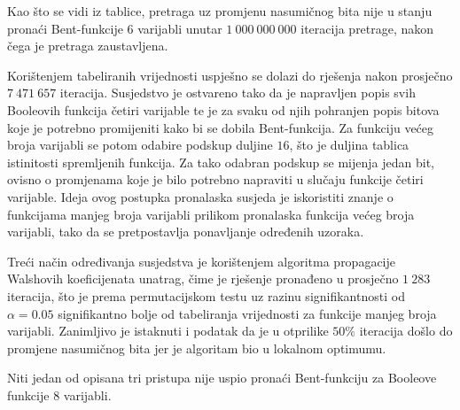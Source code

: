 Kao što se vidi iz tablice, pretraga uz promjenu nasumičnog bita nije u stanju pronaći Bent-funkcije $6$ varijabli unutar $1\:000\:000\:000$ iteracija pretrage, nakon čega je pretraga zaustavljena.

Korištenjem tabeliranih vrijednosti uspješno se dolazi do rješenja nakon prosječno $7\:471\:657$ iteracija.
Susjedstvo je ostvareno tako da je napravljen popis svih Booleovih funkcija četiri varijable te je za svaku od njih pohranjen popis bitova koje je potrebno promijeniti kako bi se dobila Bent-funkcija.
Za funkciju većeg broja varijabli se potom odabire podskup duljine $16$, što je duljina tablica istinitosti spremljenih funkcija.
Za tako odabran podskup se mijenja jedan bit, ovisno o promjenama koje je bilo potrebno napraviti u slučaju funkcije četiri varijable.
Ideja ovog postupka pronalaska susjeda je iskoristiti znanje o funkcijama manjeg broja varijabli prilikom pronalaska funkcija većeg broja varijabli, tako da se pretpostavlja ponavljanje određenih uzoraka.

Treći način određivanja susjedstva je korištenjem algoritma propagacije Walshovih koeficijenata unatrag, čime je rješenje pronađeno u prosječno $1\:283$ iteracija, što je prema permutacijskom testu uz razinu signifikantnosti od $\alpha = 0.05$ signifikantno bolje od tabeliranja vrijednosti za funkcije manjeg broja varijabli.
Zanimljivo je istaknuti i podatak da je u otprilike $50\%$ iteracija došlo do promjene nasumičnog bita jer je algoritam bio u lokalnom optimumu.

Niti jedan od opisana tri pristupa nije uspio pronaći Bent-funkciju za Booleove funkcije $8$ varijabli.


